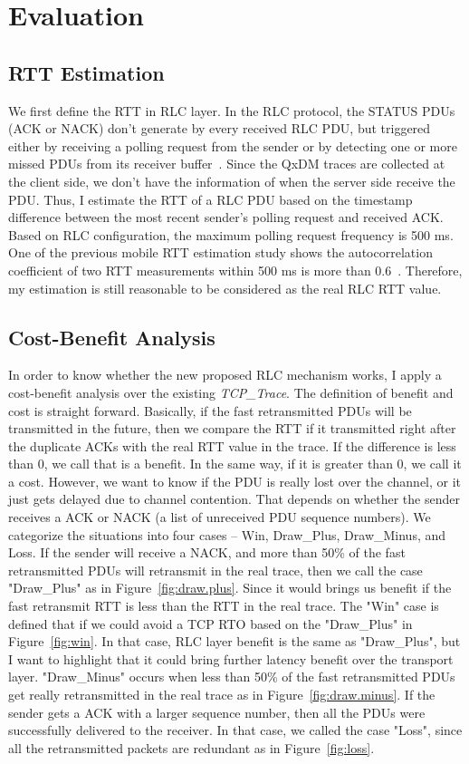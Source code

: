 \section{Evaluation}

\subsection{RTT Estimation}
We first define the RTT in RLC layer. In the RLC protocol, the STATUS PDUs (ACK or NACK) don't generate by every received RLC PDU, but triggered either by receiving a polling request from the sender or by detecting one or more missed PDUs from its receiver buffer~\cite{spec-3G-RLC}. Since the QxDM traces are collected at the client side, we don't have the information of when the server side receive the PDU. Thus, I estimate the RTT of a RLC PDU based on the timestamp difference between the most recent sender's polling request and received ACK. Based on RLC configuration, the maximum polling request frequency is 500 ms. One of the previous mobile RTT estimation study shows the autocorrelation coefficient of two RTT measurements within 500 ms is more than 0.6~\cite{proteus}. Therefore, my estimation is still reasonable to be considered as the real RLC RTT value.

\subsection{Cost-Benefit Analysis}
In order to know whether the new proposed RLC mechanism works, I apply a cost-benefit analysis over the existing \emph{TCP\_{}Trace}. The definition of benefit and cost is straight forward. Basically, if the fast retransmitted PDUs will be transmitted in the future, then we compare the RTT if it transmitted right after the duplicate ACKs with the real RTT value in the trace. If the difference is less than 0, we call that is a benefit. In the same way, if it is greater than 0, we call it a cost. However, we want to know if the PDU is really lost over the channel, or it just gets delayed due to channel contention. That depends on whether the sender receives a ACK or NACK (a list of unreceived PDU sequence numbers). We categorize the situations into four cases -- Win, Draw\_{}Plus, Draw\_{}Minus, and Loss. If the sender will receive a NACK, and more than 50\% of the fast retransmitted PDUs will retransmit in the real trace, then we call the case "Draw\_{}Plus" as in Figure~\ref{fig:draw.plus}. Since it would brings us benefit if the fast retransmit RTT is less than the RTT in the real trace. The "Win" case is defined that if we could avoid a TCP RTO based on the "Draw\_{}Plus" in Figure~\ref{fig:win}. In that case, RLC layer benefit is the same as "Draw\_{}Plus", but I want to highlight that it could bring further latency benefit over the transport layer. "Draw\_{}Minus" occurs when less than 50\% of the fast retransmitted PDUs get really retransmitted in the real trace as in Figure~\ref{fig:draw.minus}. If the sender gets a ACK with a larger sequence number, then all the PDUs were successfully delivered to the receiver. In that case, we called the case "Loss", since all the retransmitted packets are redundant as in Figure~\ref{fig:loss}. 

